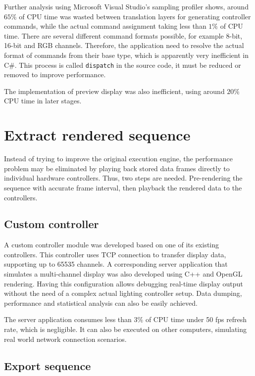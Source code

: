 \documentclass[journal]{IEEEtran}
\begin{document}
Further analysis using Microsoft Visual Studio's sampling profiler shows, around $65 \%$ of CPU time was wasted between translation layers for generating controller commands, while the actual command assignment taking less than $1 \%$ of CPU time. There are several different command formats possible, for example 8-bit, 16-bit and RGB channels. Therefore, the application need to resolve the actual format of commands from their base type, which is apparently very inefficient in C\#. This process is called \texttt{dispatch} in the source code, it must be reduced or removed to improve performance.

The implementation of preview display was also inefficient, using around $20 \%$ CPU time in later stages.

\section{Extract rendered sequence}

Instead of trying to improve the original execution engine, the performance problem may be eliminated by playing back stored data frames directly to individual hardware controllers. Thus, two steps are needed. Pre-rendering the sequence with accurate frame interval, then playback the rendered data to the controllers.

\subsection{Custom controller}

A custom controller module was developed based on one of its existing controllers. This controller uses TCP connection to transfer display data, supporting up to 65535 channels. A corresponding server application that simulates a multi-channel display was also developed using C++ and OpenGL \cite{shreiner2009opengl} rendering. Having this configuration allows debugging real-time display output without the need of a complex actual lighting controller setup. Data dumping, performance and statistical analysis can also be easily achieved.

The server application consumes less than $3 \%$ of CPU time under 50 fps refresh rate, which is negligible. It can also be executed on other computers, simulating real world network connection scenarios.

\subsection{Export sequence}
\end{document}
